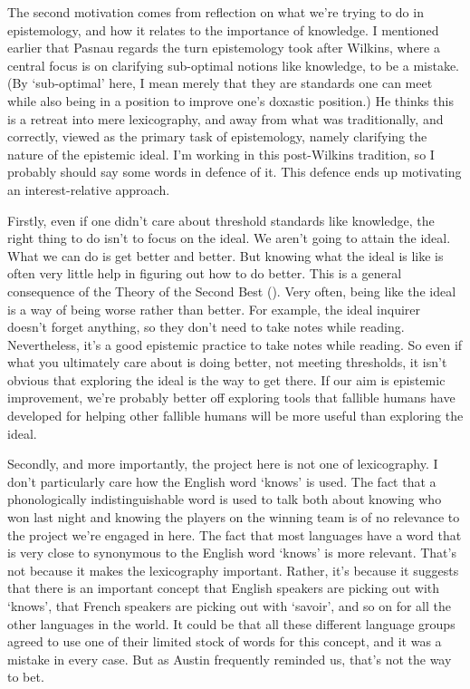 \documentclass[
  10pt,
  letterpaper,
  twoside]{scrbook}
\begin{document}
The second motivation comes from reflection on what we're trying to do
in epistemology, and how it relates to the importance of knowledge. I
mentioned earlier that Pasnau regards the turn epistemology took after
Wilkins, where a central focus is on clarifying sub-optimal notions like
knowledge, to be a mistake. (By `sub-optimal' here, I mean merely that
they are standards one can meet while also being in a position to
improve one's doxastic position.) He thinks this is a retreat into mere
lexicography, and away from what was traditionally, and correctly,
viewed as the primary task of epistemology, namely clarifying the nature
of the epistemic ideal. I'm working in this post-Wilkins tradition, so I
probably should say some words in defence of it. This defence ends up
motivating an interest-relative approach.

Firstly, even if one didn't care about threshold standards like
knowledge, the right thing to do isn't to focus on the ideal. We aren't
going to attain the ideal. What we can do is get better and better. But
knowing what the ideal is like is often very little help in figuring out
how to do better. This is a general consequence of the Theory of the
Second Best (). Very often, being like the ideal is a way of being worse
rather than better. For example, the ideal inquirer doesn't forget
anything, so they don't need to take notes while reading. Nevertheless,
it's a good epistemic practice to take notes while reading. So even if
what you ultimately care about is doing better, not meeting thresholds,
it isn't obvious that exploring the ideal is the way to get there. If
our aim is epistemic improvement, we're probably better off exploring
tools that fallible humans have developed for helping other fallible
humans will be more useful than exploring the ideal.

Secondly, and more importantly, the project here is not one of
lexicography. I don't particularly care how the English word `knows' is
used. The fact that a phonologically indistinguishable word is used to
talk both about knowing who won last night and knowing the players on
the winning team is of no relevance to the project we're engaged in
here. The fact that most languages have a word that is very close to
synonymous to the English word `knows' is more relevant. That's not
because it makes the lexicography important. Rather, it's because it
suggests that there is an important concept that English speakers are
picking out with `knows', that French speakers are picking out with
`savoir', and so on for all the other languages in the world. It could
be that all these different language groups agreed to use one of their
limited stock of words for this concept, and it was a mistake in every
case. But as Austin frequently reminded us, that's not the way to bet.
\end{document}
